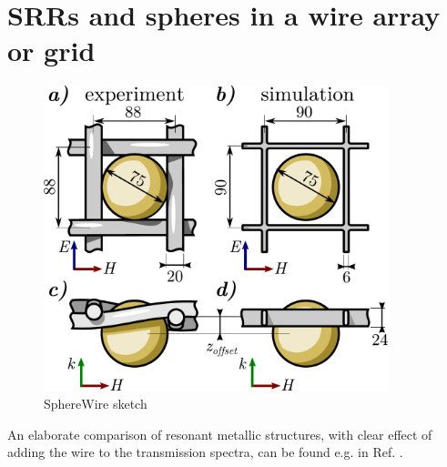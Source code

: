 




\section{SRRs and spheres in a wire array or grid} %
\begin{figure} \caption{SphereWire sketch}  \centering  \includegraphics[width=10cm]{img/SphereWire_sketch.pdf} \end{figure} \clearpage


% 
An elaborate comparison of resonant metallic structures, with clear effect of adding the wire to the transmission spectra, can be found e.g. in Ref. \cite{koschny2004effective}.

